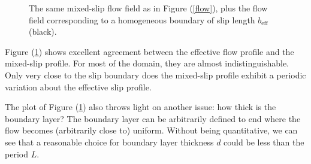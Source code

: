 \documentclass[12pt, a4paper, twoside, openright]{book}
\newcommand{\beff}{\ensuremath{b_{\mathrm{eff}}}}
\newcommand{\bmin}{\ensuremath{b_{\mathrm{min}}}}
\begin{document}
\clearpage
\begin{figure}[ht]
\centering
{}
\caption{The same mixed-slip flow field as in Figure (\ref{flow}), plus the flow field corresponding to a homogeneous boundary of slip length $\beff$ (black).}\label{floweff}
\end{figure}

Figure (\ref{floweff}) shows excellent agreement between the effective flow profile and the mixed-slip profile.  For most of the domain, they are almost indistinguishable.  Only very close to the slip boundary does the mixed-slip profile exhibit a periodic variation about the effective slip profile.

\vspace{1em}

The plot of Figure (\ref{floweff}) also throws light on another issue: how thick is the boundary layer?  The boundary layer can be  arbitrarily defined to end where the flow becomes (arbitrarily close to) uniform.  Without being quantitative, we can see that a reasonable choice for boundary layer thickness $d$ could be less than the period $L$.
\end{document}
